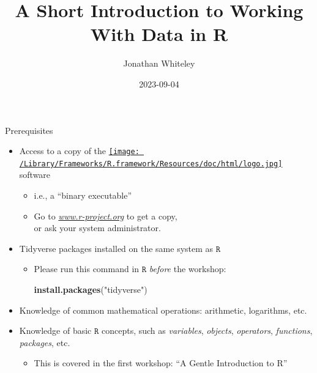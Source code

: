 \documentclass[
  11pt,
  ignorenonframetext,
]{beamer}
\title{A Short Introduction to Working With Data in R}
\author{Jonathan Whiteley}
\date{2023-09-04}
\newenvironment{Shaded}{\begin{snugshade}}{\end{snugshade}}
\newcommand{\FunctionTok}[1]{\textcolor[rgb]{0.13,0.29,0.53}{\textbf{#1}}}
\newcommand{\NormalTok}[1]{#1}
\newcommand{\StringTok}[1]{\textcolor[rgb]{0.31,0.60,0.02}{#1}}
\providecommand{\tightlist}{%
  \setlength{\itemsep}{0pt}\setlength{\parskip}{0pt}}
\newcommand{\R}{\texttt{R}}
\begin{document}
\frame{\titlepage}

\begin{frame}[fragile]{Prerequisites}
\protect\hypertarget{prerequisites}{}
\begin{itemize}
\item
  Access to a copy of the
  \href{https://www.r-project.org}{\texttt{[image: /Library/Frameworks/R.framework/Resources/doc/html/logo.jpg]}}
  software

  \begin{itemize}
  \item
    i.e., a ``binary executable''
  \item
    Go to \href{https://www.r-project.org}{\emph{www.r-project.org}} to
    get a copy,\\
    or ask your system administrator.
  \end{itemize}
\item
  Tidyverse packages installed on the same system as \(\R\)

  \begin{itemize}
  \item
    Please run this command in \(\R\) \emph{before} the workshop:

\begin{Shaded}
\begin{Highlighting}[]
\FunctionTok{install.packages}\NormalTok{(}\StringTok{"tidyverse"}\NormalTok{)}
\end{Highlighting}
\end{Shaded}
  \end{itemize}
\item
  Knowledge of common mathematical operations: arithmetic, logarithms,
  etc.
\item
  Knowledge of basic \(\R\) concepts, such as \emph{variables},
  \emph{objects}, \emph{operators}, \emph{functions}, \emph{packages},
  etc.

  \begin{itemize}
  \tightlist
  \item
    This is covered in the first workshop: ``A Gentle Introduction to
    R''
  \end{itemize}
\end{itemize}
\end{frame}
\end{document}
